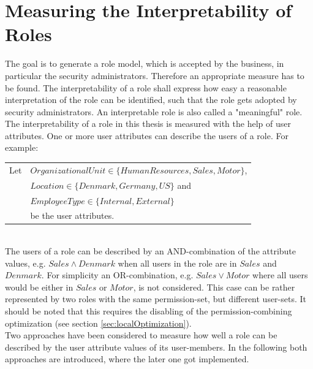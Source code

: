     \section{Measuring the Interpretability of Roles}
    \label{sec:meaningfulness}
    The goal is to generate a role model, which is accepted by the business, in particular the security administrators. Therefore an appropriate measure has to be found. The interpretability of a role shall express how easy a reasonable interpretation of the role can be identified, such that the role gets adopted by security administrators. An interpretable role is also called a "meaningful" role.\\
    The interpretability of a role in this thesis is measured with the help of user attributes. One or more user attributes can describe the users of a role. For example:\\
    \begin{listliketab}
        \begin{tabular}{ll}
            Let     &  $OrganizationalUnit \in \{HumanResources, Sales, Motor\}$,\\
                    &  $Location \in \{Denmark, Germany, US\}$ and\\
                    &  $EmployeeType \in \{Internal, External\}$\\
                    &  be the user attributes.  
        \end{tabular}
    \end{listliketab}\\
    The users of a role can be described by an AND-combination of the attribute values, e.g. $Sales \wedge Denmark$ when all users in the role are in $Sales$ and $Denmark$. For simplicity an OR-combination, e.g. $Sales \vee Motor$ where all users would be either in $Sales$ or $Motor$, is not considered. This case can be rather represented by two roles with the same permission-set, but different user-sets. It should be noted that this requires the disabling of the permission-combining optimization (see section \ref{sec:localOptimization}).\\

    Two approaches have been considered to measure how well a role can be described by the user attribute values of its user-members. In the following both approaches are introduced, where the later one got implemented.
    
